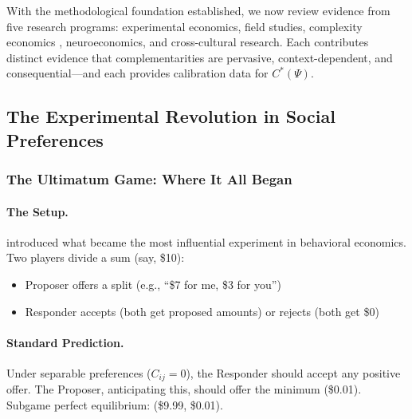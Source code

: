 


With the methodological foundation established, we now review evidence from five
research programs: experimental economics, field studies, complexity economics
\citep{arrowetal1997}, neuroeconomics, and cross-cultural research. Each contributes
distinct evidence that complementarities are pervasive, context-dependent, and
consequential---and each provides calibration data for $C^*(\Psi)$.

\subsection{The Experimental Revolution in Social Preferences}

\subsubsection{The Ultimatum Game: Where It All Began}

\paragraph{The Setup.}
\citet{guth1982} introduced what became the most influential experiment in
behavioral economics. Two players divide a sum (say, \$10):
\begin{itemize}
  \item Proposer offers a split (e.g., ``\$7 for me, \$3 for you'')
  \item Responder accepts (both get proposed amounts) or rejects (both get \$0)
\end{itemize}

\paragraph{Standard Prediction.}
Under separable preferences ($C_{ij} = 0$), the Responder should accept any positive offer.
The Proposer, anticipating this, should offer the minimum (\$0.01).
Subgame perfect equilibrium: (\$9.99, \$0.01).

